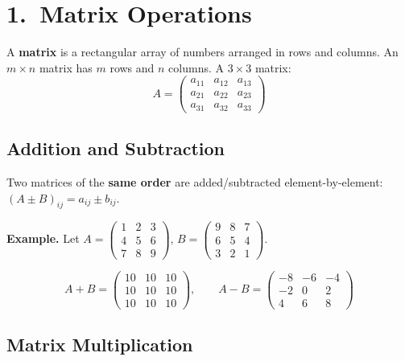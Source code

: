 \documentclass[12pt]{article}
\begin{document}
\vspace{10pt}
\tableofcontents
\newpage

\section{1.\ Matrix Operations}

\begin{defbox}[Matrix]
A \textbf{matrix} is a rectangular array of numbers arranged in rows and columns. An $m \times n$ matrix has $m$ rows and $n$ columns. A $3\times3$ matrix:
\[
A = \begin{pmatrix} a_{11} & a_{12} & a_{13} \\ a_{21} & a_{22} & a_{23} \\ a_{31} & a_{32} & a_{33} \end{pmatrix}
\]
\end{defbox}

\subsection{Addition and Subtraction}

\begin{keybox}
Two matrices of the \textbf{same order} are added/subtracted element-by-element: $(A \pm B)_{ij} = a_{ij} \pm b_{ij}$.
\end{keybox}

\textbf{Example.} Let
$A = \begin{pmatrix}1&2&3\\4&5&6\\7&8&9\end{pmatrix}$,\quad
$B = \begin{pmatrix}9&8&7\\6&5&4\\3&2&1\end{pmatrix}$.

\[
A + B = \begin{pmatrix}10&10&10\\10&10&10\\10&10&10\end{pmatrix}, \qquad
A - B = \begin{pmatrix}-8&-6&-4\\-2&0&2\\4&6&8\end{pmatrix}
\]

\subsection{Matrix Multiplication}
\end{document}

